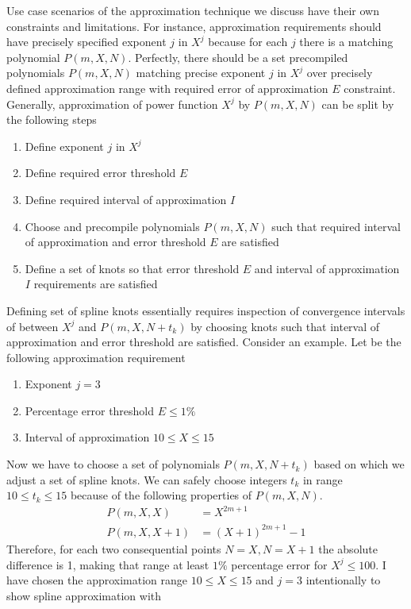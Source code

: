 ﻿Use case scenarios of the approximation technique we discuss have their own constraints and limitations.
For instance, approximation requirements should have precisely specified exponent $j$ in $X^j$ because
for each $j$ there is a matching polynomial $P(m,X,N)$.
Perfectly, there should be a set precompiled polynomials $P(m,X,N)$ matching precise exponent $j$ in $X^j$ over
precisely defined approximation range with required error of approximation $E$ constraint.
Generally, approximation of power function $X^j$ by $P(m,X,N)$ can be split by the following steps
\begin{enumerate}
    \item Define exponent $j$ in $X^j$
    \item Define required error threshold $E$
    \item Define required interval of approximation $I$
    \item Choose and precompile polynomials $P(m,X,N)$
    such that required interval of approximation and error threshold $E$ are satisfied
    \item Define a set of knots so that error threshold $E$ and interval of approximation $I$ requirements are satisfied
\end{enumerate}
Defining set of spline knots essentially requires inspection of convergence intervals of between $X^j$ and $P(m,X,N+t_k)$
by choosing knots such that interval of approximation and error threshold are satisfied.
Consider an example.
Let be the following approximation requirement
\begin{enumerate}
    \item Exponent $j=3$
    \item Percentage error threshold $E\leq 1\%$
    \item Interval of approximation $10 \leq X \leq 15$
\end{enumerate}
Now we have to choose a set of polynomials $P(m, X, N+t_k)$ based on which we adjust a set of spline knots.
We can safely choose integers $t_k$ in range $10 \leq t_k \leq 15$ because
of the following properties of $P(m,X, N)$.
\begin{align*}
    P(m,X, X) &= X^{2m+1} \\
    P(m,X, X+1) &= (X+1)^{2m+1} - 1
\end{align*}
Therefore, for each two consequential points $N=X, N=X+1$ the absolute difference is 1, making that range
at least $1\%$ percentage error for $X^j \leq 100$.
I have chosen the approximation range $10 \leq X \leq 15$ and $j=3$ intentionally to show spline approximation with
